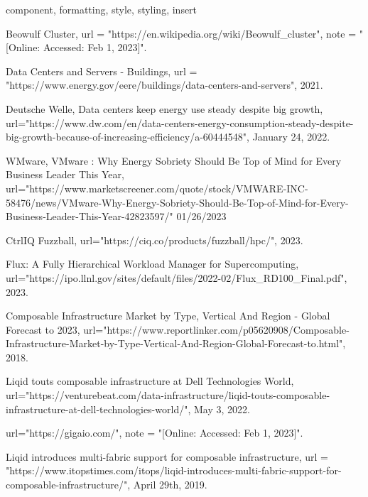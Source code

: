\documentclass[conference]{IEEEtran}
\begin{document}
\begin{IEEEkeywords}
component, formatting, style, styling, insert
\end{IEEEkeywords}







%

\begin{thebibliography}{20}


  Beowulf Cluster,
  url = "https://en.wikipedia.org/wiki/Beowulf_cluster",
  note = "[Online: Accessed: Feb 1, 2023]".

  Data Centers and Servers - Buildings,
  url = "https://www.energy.gov/eere/buildings/data-centers-and-servers",
  2021.
  
  Deutsche Welle,
  Data centers keep energy use steady despite big growth,
  url="https://www.dw.com/en/data-centers-energy-consumption-steady-despite-big-growth-because-of-increasing-efficiency/a-60444548",
  January 24, 2022.
  
  WMware,
  VMware : Why Energy Sobriety Should Be Top of Mind for Every Business Leader This Year,
  url="https://www.marketscreener.com/quote/stock/VMWARE-INC-58476/news/VMware-Why-Energy-Sobriety-Should-Be-Top-of-Mind-for-Every-Business-Leader-This-Year-42823597/"
  01/26/2023
  
  CtrlIQ Fuzzball,
  url="https://ciq.co/products/fuzzball/hpc/",
  2023.
  
  Flux:  A Fully Hierarchical Workload Manager for Supercomputing,
  url="https://ipo.llnl.gov/sites/default/files/2022-02/Flux_RD100_Final.pdf",
  2023. 
  
  Composable Infrastructure Market by Type, Vertical And Region - Global Forecast to 2023,
  url="https://www.reportlinker.com/p05620908/Composable-Infrastructure-Market-by-Type-Vertical-And-Region-Global-Forecast-to.html",
  2018.
  
  Liqid touts composable infrastructure at Dell Technologies World,
  url="https://venturebeat.com/data-infrastructure/liqid-touts-composable-infrastructure-at-dell-technologies-world/",
  May 3, 2022.
  
  url="https://gigaio.com/",
  note = "[Online: Accessed: Feb 1, 2023]". 
  
  Liqid introduces multi-fabric support for composable infrastructure,
  url = "https://www.itopstimes.com/itops/liqid-introduces-multi-fabric-support-for-composable-infrastructure/",
  April 29th, 2019.
  

\end{thebibliography}
\end{document}
